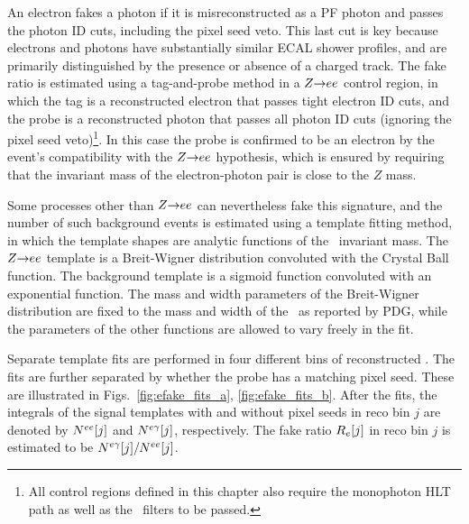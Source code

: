 An electron fakes a photon if it is misreconstructed as a PF photon and passes the photon ID cuts, including the pixel seed veto. This last cut is key because electrons
and photons have substantially similar ECAL shower profiles, and are primarily distinguished by the presence or absence of a charged track.
The fake ratio is estimated using a tag-and-probe method in a $Z{\rightarrow}ee$ control region, in which the tag is
a reconstructed electron that passes tight electron ID cuts, and the probe is a reconstructed photon that passes all photon ID cuts (ignoring the pixel
seed veto)\footnote{All control regions defined in this chapter also require the monophoton HLT path as well as the \MET\ filters to be passed.}.
In this case the probe is confirmed to be an electron by the event's compatibility with the $Z{\rightarrow}ee$ hypothesis, which is ensured by requiring that the invariant mass
of the electron-photon pair is close to the $Z$ mass.

Some processes other than $Z{\rightarrow}ee$ can nevertheless fake this signature, and the number of such background events is estimated using a template fitting method,
in which the template shapes are analytic functions of the \Pe\Pe\ invariant mass.
The $Z{\rightarrow}ee$ template is a Breit-Wigner distribution convoluted with the Crystal Ball function.
The background template is a sigmoid function convoluted with an exponential function.
The mass and width parameters of the Breit-Wigner distribution are fixed to the mass and width of the \PZ\ as reported by PDG, while the parameters of the other functions
are allowed to vary freely in the fit.

Separate template fits are performed in four different bins of reconstructed \ETgamma.
The fits are further separated by whether the probe has a matching pixel seed. These are illustrated in Figs.~\ref{fig:efake_fits_a}, \ref{fig:efake_fits_b}.
After the fits, the integrals of the signal templates with and without
pixel seeds in reco bin $j$ are denoted by $N^{ee}[j]$ and $N^{e\gamma}[j]$, respectively.
The fake ratio $R_{e}[j]$ in reco bin $j$ is estimated to be $N^{e\gamma}[j] / N^{ee}[j]$.

